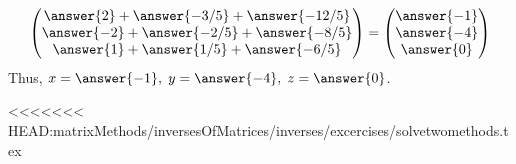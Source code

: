 \documentclass{ximera}
\begin{document}
\begin{exercise}
\begin{prompt}
\[\begin{pmatrix}
\answer{2}+\answer{-3/5} + \answer{-12/5}\\
\answer{-2}+\answer{-2/5} + \answer{-8/5}\\
\answer{1}+\answer{1/5} + \answer{-6/5}
\end{pmatrix}= \begin{pmatrix}
\answer{-1}\\
\answer{-4}\\
\answer{0}
\end{pmatrix}
\]
Thus, $x= \answer{-1}, \hspace{.1cm} y= \answer{-4},\hspace{.1cm} z= \answer{0}$.
\end{prompt}
\end{exercise}














<<<<<<< HEAD:matrixMethods/inversesOfMatrices/inverses/excercises/solvetwomethods.tex
\end{document}
